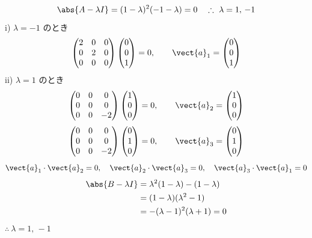 \[ \abs{A-\lambda I}=(1-\lambda)^{2}(-1-\lambda)=0\quad\therefore\ \lambda=1,\,-1 \]
i) $\lambda=-1$ のとき
\[ \begin{pmatrix}2&0&0\\0&2&0\\0&0&0\end{pmatrix}\begin{pmatrix}0\\0\\1\end{pmatrix}=0,\qquad\vect{a}_{1}=\begin{pmatrix}0\\0\\1\end{pmatrix} \]
ii) $\lambda=1$ のとき
\[ \begin{pmatrix}0&0&0\\0&0&0\\0&0&-2\end{pmatrix}\begin{pmatrix}1\\0\\0\end{pmatrix}=0,\qquad\vect{a}_{2}=\begin{pmatrix}1\\0\\0\end{pmatrix} \]
\[ \begin{pmatrix}0&0&0\\0&0&0\\0&0&-2\end{pmatrix}\begin{pmatrix}0\\1\\0\end{pmatrix}=0,\qquad\vect{a}_{3}=\begin{pmatrix}0\\1\\0\end{pmatrix} \]
\[ \vect{a}_{1}\cdot\vect{a}_{2}=0,\quad\vect{a}_{2}\cdot\vect{a}_{3}=0,\quad\vect{a}_{3}\cdot\vect{a}_{1}=0 \]
\begin{align*}
\abs{B-\lambda I}&=\lambda^{2}(1-\lambda)-(1-\lambda)\\
&=(1-\lambda)(\lambda^{2}-1)\\
&=-(\lambda-1)^{2}(\lambda+1)=0
\end{align*}
$\therefore\ \lambda=1,\,-1$

